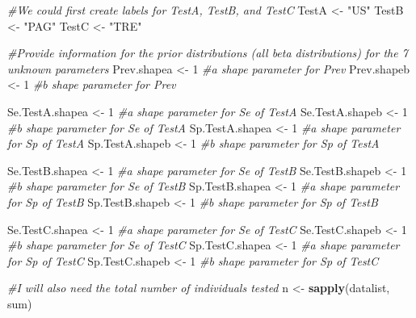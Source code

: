 \documentclass[
]{book}
\newenvironment{Shaded}{\begin{snugshade}}{\end{snugshade}}
\newcommand{\CommentTok}[1]{\textcolor[rgb]{0.56,0.35,0.01}{\textit{#1}}}
\newcommand{\DecValTok}[1]{\textcolor[rgb]{0.00,0.00,0.81}{#1}}
\newcommand{\FunctionTok}[1]{\textcolor[rgb]{0.13,0.29,0.53}{\textbf{#1}}}
\newcommand{\NormalTok}[1]{#1}
\newcommand{\OtherTok}[1]{\textcolor[rgb]{0.56,0.35,0.01}{#1}}
\newcommand{\StringTok}[1]{\textcolor[rgb]{0.31,0.60,0.02}{#1}}
\begin{document}
\begin{Shaded}
\begin{Highlighting}[]
\CommentTok{\#We could first create labels for TestA, TestB, and TestC}
\NormalTok{TestA }\OtherTok{\textless{}{-}} \StringTok{"US"}
\NormalTok{TestB }\OtherTok{\textless{}{-}} \StringTok{"PAG"}
\NormalTok{TestC }\OtherTok{\textless{}{-}} \StringTok{"TRE"}

\CommentTok{\#Provide information for the prior distributions (all beta distributions) for the 7 unknown parameters }
\NormalTok{Prev.shapea }\OtherTok{\textless{}{-}} \DecValTok{1}         \CommentTok{\#a shape parameter for Prev     }
\NormalTok{Prev.shapeb }\OtherTok{\textless{}{-}} \DecValTok{1}         \CommentTok{\#b shape parameter for Prev }

\NormalTok{Se.TestA.shapea }\OtherTok{\textless{}{-}} \DecValTok{1}     \CommentTok{\#a shape parameter for Se of TestA}
\NormalTok{Se.TestA.shapeb }\OtherTok{\textless{}{-}} \DecValTok{1}     \CommentTok{\#b shape parameter for Se of TestA}
\NormalTok{Sp.TestA.shapea }\OtherTok{\textless{}{-}} \DecValTok{1}     \CommentTok{\#a shape parameter for Sp of TestA}
\NormalTok{Sp.TestA.shapeb }\OtherTok{\textless{}{-}} \DecValTok{1}     \CommentTok{\#b shape parameter for Sp of TestA}

\NormalTok{Se.TestB.shapea }\OtherTok{\textless{}{-}} \DecValTok{1}     \CommentTok{\#a shape parameter for Se of TestB}
\NormalTok{Se.TestB.shapeb }\OtherTok{\textless{}{-}} \DecValTok{1}     \CommentTok{\#b shape parameter for Se of TestB}
\NormalTok{Sp.TestB.shapea }\OtherTok{\textless{}{-}} \DecValTok{1}     \CommentTok{\#a shape parameter for Sp of TestB}
\NormalTok{Sp.TestB.shapeb }\OtherTok{\textless{}{-}} \DecValTok{1}     \CommentTok{\#b shape parameter for Sp of TestB}

\NormalTok{Se.TestC.shapea }\OtherTok{\textless{}{-}} \DecValTok{1}     \CommentTok{\#a shape parameter for Se of TestC}
\NormalTok{Se.TestC.shapeb }\OtherTok{\textless{}{-}} \DecValTok{1}     \CommentTok{\#b shape parameter for Se of TestC}
\NormalTok{Sp.TestC.shapea }\OtherTok{\textless{}{-}} \DecValTok{1}     \CommentTok{\#a shape parameter for Sp of TestC}
\NormalTok{Sp.TestC.shapeb }\OtherTok{\textless{}{-}} \DecValTok{1}     \CommentTok{\#b shape parameter for Sp of TestC}

\CommentTok{\#I will also need the total number of individuals tested }
\NormalTok{n }\OtherTok{\textless{}{-}} \FunctionTok{sapply}\NormalTok{(datalist, sum)}
\end{Highlighting}
\end{Shaded}
\end{document}
